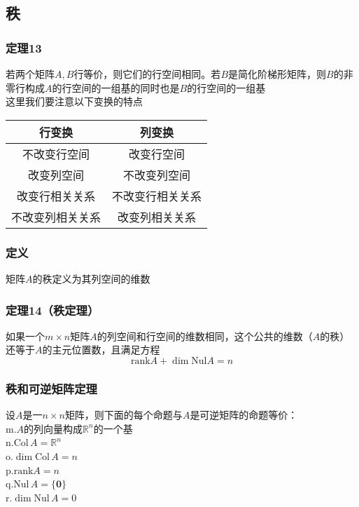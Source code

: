 \documentclass{article}
\newcommand{\ve}{\boldsymbol}
\begin{document}
\begin{CJK}{UTF8}{gkai}
\subsection{秩}
\subsubsection{定理13}
若两个矩阵$A,B$行等价，则它们的行空间相同。若$B$是简化阶梯形矩阵，则$B$的非零行构成$A$的行空间的一组基的同时也是$B$的行空间的一组基\\

这里我们要注意以下变换的特点\\
\begin{tabular}{|c|c|}
    \hline
    行变换&列变换\\
    \hline
    不改变行空间&改变行空间\\
    \hline
    改变列空间&不改变列空间\\
    \hline
    改变行相关关系&不改变行相关关系\\
    \hline
    不改变列相关关系&改变列相关关系\\
    \hline
\end{tabular}
\subsubsection{定义}
矩阵$A$的秩定义为其列空间的维数\\
\subsubsection{定理14（秩定理）}

如果一个$m\times n$矩阵$A$的列空间和行空间的维数相同，这个公共的维数（$A$的秩）还等于$A$的主元位置数，且满足方程
\[\text{rank} A+\dim \text{Nul} A=n\]

\subsubsection{秩和可逆矩阵定理}
设$A$是一$n\times n$矩阵，则下面的每个命题与$A$是可逆矩阵的命题等价：\\
m.$A$的列向量构成$\mathbb{R}^n$的一个基\\
n.$\text{Col}\, A=\mathbb{R}^n$\\
o.$\dim \text{Col}\, A=n$\\
p.$\text{rank} A=n$\\
q.$\text{Nul}\, A=\{\ve{0}\}$\\
r.$\dim \text{Nul}\, A=0$\\


\end{CJK}
\end{document}
